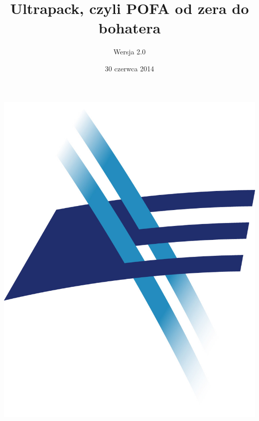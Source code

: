 \documentclass[a4paper, 10pt, ]{article}
\title{Ultrapack, czyli POFA od zera do bohatera}
\author{Wersja 2.0}
\date{30 czerwca 2014}
\begin{document}
\maketitle
\begin{center}
	\includegraphics{logo}
\end{center}

\thispagestyle{empty}
\newpage
\section*{ }

\newpage
\end{document}
